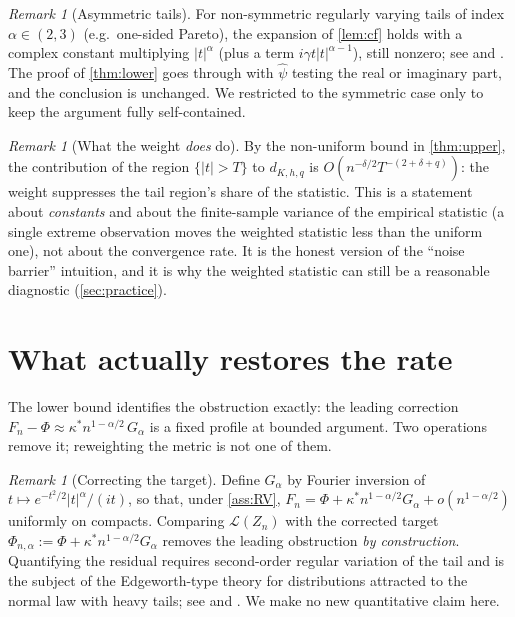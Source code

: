\documentclass[11pt,a4paper]{article}
\theoremstyle{plain}
\theoremstyle{definition}
\theoremstyle{remark}
\newtheorem{remark}[theorem]{Remark}
\numberwithin{equation}{section}
\newcommand{\1}{\mathbbm{1}}
\newcommand{\h}{h}
\begin{document}
\begin{remark}[Asymmetric tails]\label{rem:asym}
For non-symmetric regularly varying tails of index $\alpha\in(2,3)$ (e.g.\ one-sided
Pareto), the expansion of \cref{lem:cf} holds with a complex constant multiplying
$|t|^\alpha$ (plus a term $i\gamma t|t|^{\alpha-1}$), still nonzero; see
\cite[Ch.~2]{IbragimovLinnik} and \cite{ChristophWolf}. The proof of \cref{thm:lower}
goes through with $\widehat\psi$ testing the real or imaginary part, and the conclusion
is unchanged. We restricted to the symmetric case only to keep the argument fully
self-contained.
\end{remark}

\begin{remark}[What the weight \emph{does} do]\label{rem:constants}
By the non-uniform bound in \cref{thm:upper}, the contribution of the region
$\{|t|>T\}$ to $d_{K,\h,q}$ is $O(n^{-\delta/2}T^{-(2+\delta+q)})$: the weight
suppresses the tail region's share of the statistic. This is a statement about
\emph{constants} and about the finite-sample variance of the empirical statistic (a
single extreme observation moves the weighted statistic less than the uniform one),
not about the convergence rate. It is the honest version of the ``noise barrier''
intuition, and it is why the weighted statistic can still be a reasonable diagnostic
(\cref{sec:practice}).
\end{remark}

\section{What actually restores the rate}\label{sec:whatworks}

The lower bound identifies the obstruction exactly: the leading correction
$F_n-\Phi\approx \kappa^\ast n^{1-\alpha/2}\,G_\alpha$ is a fixed profile at bounded
argument. Two operations remove it; reweighting the metric is not one of them.

\begin{remark}[Correcting the target]\label{rem:target}
Define $G_\alpha$ by Fourier inversion of
$t\mapsto e^{-t^2/2}|t|^\alpha/(it)$, so that, under \cref{ass:RV},
$F_n=\Phi+\kappa^\ast n^{1-\alpha/2}G_\alpha+o(n^{1-\alpha/2})$ uniformly on compacts.
Comparing $\mathcal L(Z_n)$ with the corrected target
$\Phi_{n,\alpha}:=\Phi+\kappa^\ast n^{1-\alpha/2}G_\alpha$ removes the leading
obstruction \emph{by construction}. Quantifying the residual requires second-order
regular variation of the tail and is the subject of the Edgeworth-type theory for
distributions attracted to the normal law with heavy tails; see
\cite{ChristophWolf} and \cite[Ch.~2]{IbragimovLinnik}. We make no new quantitative
claim here.
\end{remark}
\end{document}

